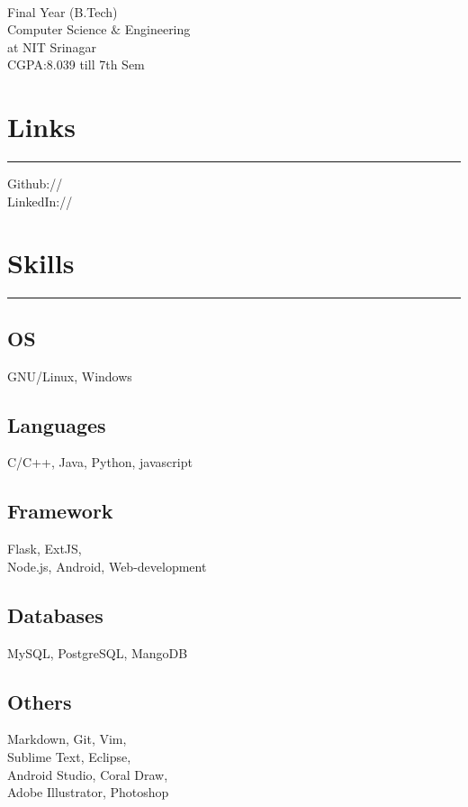 \documentclass[]{rahulworld-resume}
\begin{document}
%
%

\begin{minipage}[t]{0.33\textwidth} 
\begin{large}
	\\
\end{large}
Final Year (B.Tech)\\
Computer Science $\&$  Engineering\\ 
at NIT Srinagar \\ 
CGPA:8.039 till 7th Sem 
\section{Links} 
\noindent\rule{5cm}{0.4pt}

Github:// \href{https://github.com/srayan00}{} \\
LinkedIn://  \href{https://www.linkedin.com/in/sahanarayan}{} \\
\section{Skills}
\noindent\rule{5cm}{0.4pt}
\subsection{OS}
GNU/Linux, Windows
\vspace{6pt}
\subsection{Languages}
C/C++, Java, Python, javascript
\vspace{6pt}
\subsection{Framework}
Flask, ExtJS, \\Node.js, Android,
Web-development
\vspace{6pt}
\subsection{Databases}
MySQL, PostgreSQL, MangoDB
\vspace{6pt}
\subsection{Others}
Markdown, Git, Vim, \\Sublime Text, Eclipse,\\
Android Studio, Coral Draw,\\
Adobe Illustrator, Photoshop
\sectionsep

\end{minipage}
\end{document}
